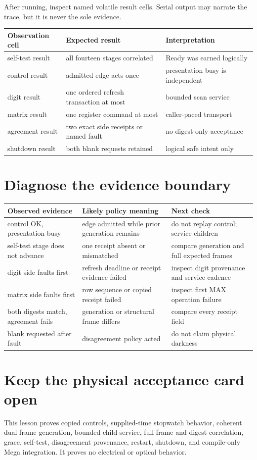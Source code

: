 \documentclass[10pt]{article}
\begin{document}
After running, inspect named volatile result cells. Serial output may narrate
the trace, but it is never the sole evidence.

\begin{tabularx}{\linewidth}{@{}X X X@{}}
\toprule
Observation cell & Expected result & Interpretation\\
\midrule
self-test result & all fourteen stages correlated & Ready was earned logically\\
control result & admitted edge acts once & presentation busy is independent\\
digit result & one ordered refresh transaction at most & bounded scan service\\
matrix result & one register command at most & caller-paced transport\\
agreement result & two exact side receipts or named fault & no digest-only acceptance\\
shutdown result & both blank requests retained & logical safe intent only\\
\bottomrule
\end{tabularx}

\section{Diagnose the evidence boundary}
\begin{tabularx}{\linewidth}{@{}X X X@{}}
\toprule
Observed evidence & Likely policy meaning & Next check\\
\midrule
control OK, presentation busy & edge admitted while prior generation remains & do not replay control; service children\\
self-test stage does not advance & one receipt absent or mismatched & compare generation and full expected frames\\
digit side faults first & refresh deadline or receipt evidence failed & inspect digit provenance and service cadence\\
matrix side faults first & row sequence or copied receipt failed & inspect first MAX operation failure\\
both digests match, agreement fails & generation or structural frame differs & compare every receipt field\\
blank requested after fault & disagreement policy acted & do not claim physical darkness\\
\bottomrule
\end{tabularx}

\section{Keep the physical acceptance card open}
This lesson proves copied controls, supplied-time stopwatch behavior, coherent
dual frame generation, bounded child service, full-frame and digest
correlation, grace, self-test, disagreement provenance, restart, shutdown, and
compile-only Mega integration. It proves no electrical or optical behavior.
\end{document}

